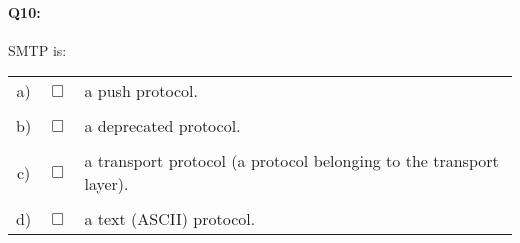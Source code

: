 \documentclass{llncs}
\begin{document}
\paragraph{\textbf{Q10:}} SMTP is:\\

\begin{tabular}{ccl}
  a) & $\Box$ & a push protocol.\\
  \\
  b) & $\Box$ & a deprecated protocol.\\
  \\
  c) & $\Box$ & a transport protocol (a protocol belonging to the transport layer).\\
  \\
  d) & $\Box$ & a text (ASCII) protocol.\\
\end{tabular}
\end{document}
